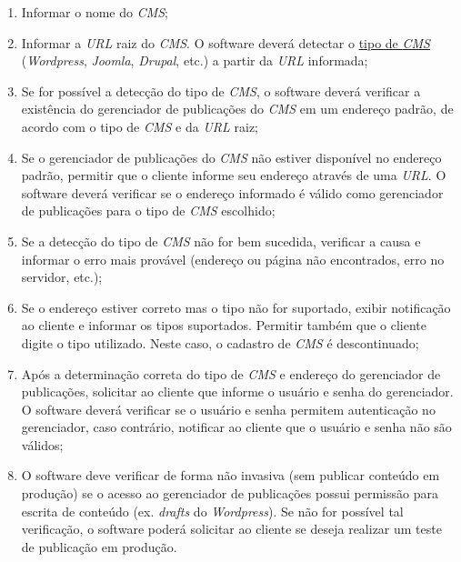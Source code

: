 \documentclass[a4paper,12pt]{article}
\def\cms{\emph{CMS}}
\def\url{\emph{URL}}
\def\tipocms{\hyperref[tipocms]{tipo de \cms{}}}
\begin{document}
\begin{enumerate}

\item Informar o nome do \cms{};

\item Informar a \url{} raiz do \cms{}. O software deverá detectar o \tipocms{}
(\emph{Wordpress}, \emph{Joomla}, \emph{Drupal}, etc.) a partir da \url{}
informada;

\item Se for possível a detecção do tipo de \cms{}, o software deverá verificar
a existência do gerenciador de publicações do \cms{} em um endereço padrão, de
acordo com o tipo de \cms{} e da \url{} raiz;

\item Se o gerenciador de publicações do \cms{} não estiver disponível no
endereço padrão, permitir que o cliente informe seu endereço através de uma
\url{}. O software deverá verificar se o endereço informado é válido como
gerenciador de publicações para o tipo de \cms{} escolhido;

\item Se a detecção do tipo de \cms{} não for bem sucedida, verificar a causa e
informar o erro mais provável (endereço ou página não encontrados, erro no
servidor, etc.);

\item Se o endereço estiver correto mas o tipo não for suportado, exibir
notificação ao cliente e informar os tipos suportados. Permitir também que o
cliente digite o tipo utilizado. Neste caso, o cadastro de \cms{} é descontinuado;

\item Após a determinação correta do tipo de \cms{} e endereço do gerenciador
de publicações, solicitar ao cliente que informe o usuário e senha do
gerenciador. O software deverá verificar se o usuário e senha permitem
autenticação no gerenciador, caso contrário, notificar ao cliente que o usuário
e senha não são válidos;

\item O software deve verificar de forma não invasiva (sem publicar conteúdo em
produção) se o acesso ao gerenciador de publicações possui permissão para
escrita de conteúdo (ex. \emph{drafts} do \emph{Wordpress}). Se não for
possível tal verificação, o software poderá solicitar ao cliente se deseja
realizar um teste de publicação em produção.

\end{enumerate}
\end{document}
